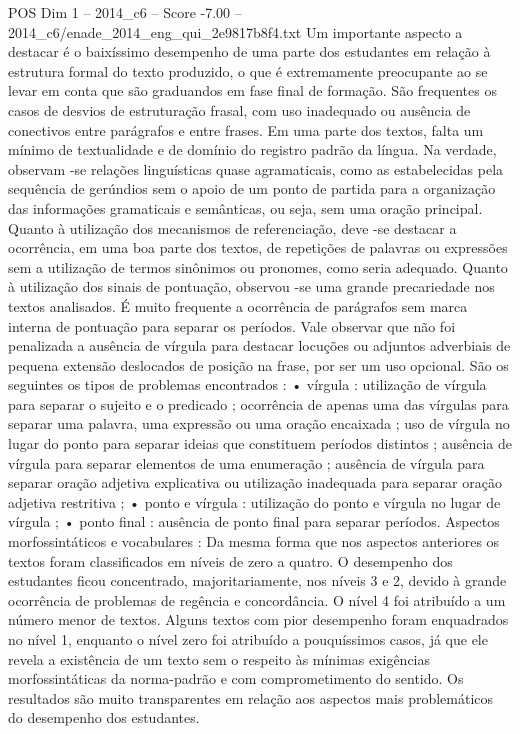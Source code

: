\begin{textsample}{POS Dim 1 – 2014\_c6 – Score -7.00 – 2014\_c6/enade\_2014\_eng\_qui\_2e9817b8f4.txt}
Um importante aspecto a destacar é o baixíssimo desempenho de uma parte dos estudantes em relação à estrutura formal do texto produzido, o que é extremamente preocupante ao se levar em conta que são graduandos em fase final de formação.
São frequentes os casos de desvios de estruturação frasal, com uso inadequado ou ausência de conectivos entre parágrafos e entre frases.
Em uma parte dos textos, falta um mínimo de textualidade e de domínio do registro padrão da língua.
Na verdade, observam -se relações linguísticas quase agramaticais, como as estabelecidas pela sequência de gerúndios sem o apoio de um ponto de partida para a organização das informações gramaticais e semânticas, ou seja, sem uma oração principal.
Quanto à utilização dos mecanismos de referenciação, deve -se destacar a ocorrência, em uma boa parte dos textos, de repetições de palavras ou expressões sem a utilização de termos sinônimos ou pronomes, como seria adequado.
Quanto à utilização dos sinais de pontuação, observou -se uma grande precariedade nos textos analisados.
É muito frequente a ocorrência de parágrafos sem marca interna de pontuação para separar os períodos.
Vale observar que não foi penalizada a ausência de vírgula para destacar locuções ou adjuntos adverbiais de pequena extensão deslocados de posição na frase, por ser um uso opcional.
São os seguintes os tipos de problemas encontrados : • vírgula : utilização de vírgula para separar o sujeito e o predicado ; ocorrência de apenas uma das vírgulas para separar uma palavra, uma expressão ou uma oração encaixada ; uso de vírgula no lugar do ponto para separar ideias que constituem períodos distintos ; ausência de vírgula para separar elementos de uma enumeração ; ausência de vírgula para separar oração adjetiva explicativa ou utilização inadequada para separar oração adjetiva restritiva ; • ponto e vírgula : utilização do ponto e vírgula no lugar de vírgula ; • ponto final : ausência de ponto final para separar períodos.
Aspectos morfossintáticos e vocabulares : Da mesma forma que nos aspectos anteriores os textos foram classificados em níveis de zero a quatro.
O desempenho dos estudantes ficou concentrado, majoritariamente, nos níveis 3 e 2, devido à grande ocorrência de problemas de regência e concordância.
O nível 4 foi atribuído a um número menor de textos.
Alguns textos com pior desempenho foram enquadrados no nível 1, enquanto o nível zero foi atribuído a pouquíssimos casos, já que ele revela a existência de um texto sem o respeito às mínimas exigências morfossintáticas da norma-padrão e com comprometimento do sentido.
Os resultados são muito transparentes em relação aos aspectos mais problemáticos do desempenho dos estudantes.

\end{textsample}
